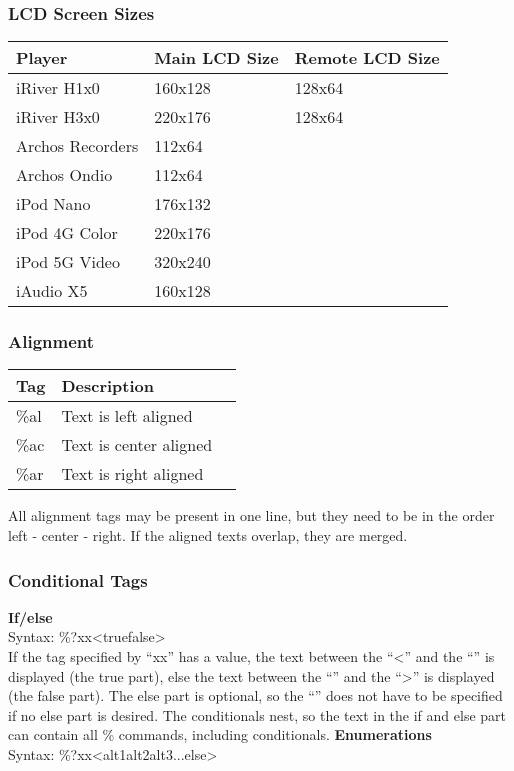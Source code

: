 \subsubsection{LCD Screen Sizes}
\begin{center}
  \begin{tabular}{@{}lll@{}}\toprule
    \textbf{Player} & \textbf{Main LCD Size} & \textbf{Remote LCD Size}\\\midrule
    iRiver H1x0 & 160x128 & 128x64\\
    iRiver H3x0 & 220x176 & 128x64\\
    Archos Recorders & 112x64 & \\ 
    Archos Ondio & 112x64 & \\
    iPod Nano & 176x132 & \\
    iPod 4G Color & 220x176 & \\
    iPod 5G Video & 320x240 & \\
    iAudio X5 & 160x128 & \\\bottomrule
  \end{tabular}
\end{center}

\subsubsection{Alignment}
\begin{center}
  \begin{tabular}{@{}lll@{}}\toprule
    \textbf{Tag} & \textbf{Description}\\\midrule
    \%al & Text is left aligned\\
    \%ac & Text is center aligned\\
    \%ar & Text is right aligned\\\bottomrule
  \end{tabular}
\end{center}
All alignment tags may be present in one line, but they need to be in the order left - center - right. If the aligned texts overlap, they are merged.

\subsubsection{Conditional Tags}
\textbf{If/else}\\
\newline
Syntax: \%?xx{\textless}true{\textbar}false{\textgreater}\\

If the tag specified by ``xx'' has a value, the text between the ``{\textless}'' and the ``{\textbar}'' is displayed (the true part), else the text between the ``{\textbar}'' and the ``{\textgreater}'' is displayed (the false part).
The else part is optional, so the ``{\textbar}'' does not have to be specified if no else part is desired. The conditionals nest, so the text in the if and else part can contain all \% commands, including conditionals.
\newline
\textbf{Enumerations}\\
\newline
Syntax: \%?xx{\textless}alt1{\textbar}alt2{\textbar}alt3{\textbar}...{\textbar}else{\textgreater}


